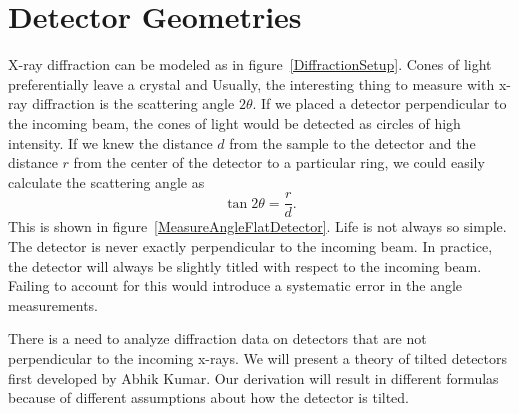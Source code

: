 \chapter{Detector Geometries}\label{theory_chapter}

X-ray diffraction can be modeled as in figure~\ref{DiffractionSetup}. 
Cones of light preferentially leave a crystal and Usually, the 
interesting thing to measure with x-ray 
diffraction is the scattering angle 
$2\theta$. If we placed a detector perpendicular 
to the incoming beam, the cones of light would be detected as 
circles of high intensity. 
If we knew the distance $d$ from the sample to the detector and 
the distance $r$ from the center of the detector to a 
particular ring, we could easily calculate the scattering angle as
\begin{equation}
    \tan2\theta = \frac{r}{d}.
\end{equation}
This is shown in figure~\ref{MeasureAngleFlatDetector}. 
Life is not always so simple. The detector is never
exactly perpendicular to the incoming beam.  In practice, 
the detector will always be slightly titled with respect 
to the incoming beam. Failing to account for this would
introduce a systematic error in the angle measurements.

\begin{SCfigure}[1][bthp]
    \centering
    
    \caption{An X-Ray diffraction setup. X-rays scatter from a 
    sample and are captured by a detector.}
    \label{DiffractionSetup}
\end{SCfigure}

\begin{SCfigure}[1][bthp]
    \centering
    
    \caption{The same setup as in figure~\ref{DiffractionSetup}. 
    $2\theta$ is the scattering angle of the light,
    $d$ is the distance 
    from the crystal to the detector, and $r$ is the distance 
    from the center of the detector.}
    \label{MeasureAngleFlatDetector}
\end{SCfigure}

There is a need to analyze diffraction data on detectors that are 
not perpendicular to the incoming x-rays. We will present a 
theory of tilted detectors first developed by Abhik Kumar\cite{Kumar05}.
 Our derivation will result in 
different formulas because of different assumptions
about how the detector is tilted. 

